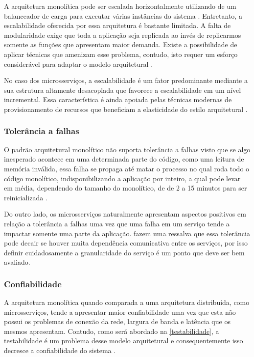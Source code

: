 A arquitetura monolítica pode ser escalada horizontalmente utilizando de um balanceador de carga
para executar várias instâncias do sistema \cite{MartinFowler:Microservices}. Entretanto, a
escalabilidade oferecida por essa arquitetura é bastante limitada. A falta de modularidade exige que
toda a aplicação seja replicada ao invés de replicarmos somente as funções que apresentam maior demanda.
Existe a possibilidade de aplicar técnicas que amenizam esse problema, contudo, isto requer um esforço
considerável para adaptar o modelo arquitetural \cite{Richards2020:FundamentalsOfSoftwareArchitecture}.

No caso dos microsserviços, a escalabilidade é um fator predominante mediante a sua estrutura
altamente desacoplada que favorece a escalabilidade em um nível incremental. Essa característica é
ainda apoiada pelas técnicas modernas de provisionamento de recursos que beneficiam a elasticidade
do estilo arquitetural \cite{Richards2020:FundamentalsOfSoftwareArchitecture}.

\subsubsection{Tolerância a falhas}
\label{pers:tolerancia}

O padrão arquitetural monolítico não suporta tolerância a falhas visto que se algo inesperado
acontece em uma determinada parte do código, como uma leitura de memória inválida, essa falha se
propaga até matar o processo no qual roda todo o código monolítico, indisponibilizando a
aplicação por inteiro, a qual pode levar em média, dependendo do tamanho do monolítico, de de 2 a
15 minutos para ser reinicializada \cite{Richards2020:FundamentalsOfSoftwareArchitecture}.

Do outro lado, os microsserviços naturalmente apresentam aspectos positivos em relação a tolerância
a falhas uma vez que uma falha em um serviço tende a impactar somente uma parte da aplicação.
 fazem uma ressalva que essa tolerância pode
decair se houver muita dependência comunicativa entre os serviços, por isso definir cuidadosamente a
granularidade do serviço é um ponto que deve ser bem avaliado.

\subsubsection{Confiabilidade}
\label{pers:confiabilidade}

A arquitetura monolítica quando comparada a uma arquitetura distribuída, como microsserviços, tende
a apresentar maior confiabilidade uma vez que esta não possui os problemas de conexão da rede,
largura de banda e latência que os mesmos apresentam. Contudo, como será abordado na
\autoref{testabilidade}, a testabilidade é um problema desse modelo arquitetural e consequentemente
isso decresce a confiabilidade do sistema \cite{Richards2020:FundamentalsOfSoftwareArchitecture}.

